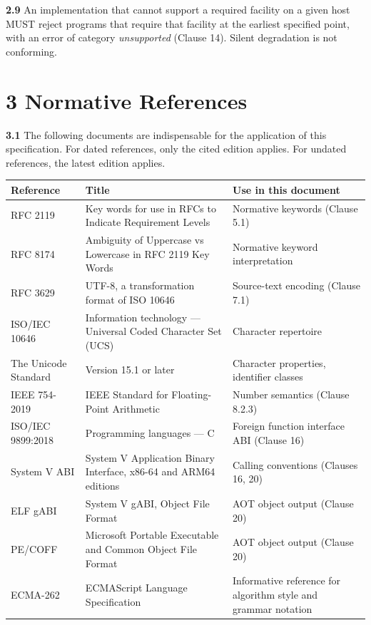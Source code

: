 \documentclass[
  english,
  11pt,
  a4paper,
]{article}
\begin{document}
\textbf{2.9} An implementation that cannot support a required facility
on a given host MUST reject programs that require that facility at the
earliest specified point, with an error of category \emph{unsupported}
(Clause 14). Silent degradation is not conforming.

\section{3 Normative References}\label{normative-references}

\textbf{3.1} The following documents are indispensable for the
application of this specification. For dated references, only the cited
edition applies. For undated references, the latest edition applies.

\begin{longtable}[]{@{}
  >{\raggedright\arraybackslash}p{}
  >{\raggedright\arraybackslash}p{}
  >{\raggedright\arraybackslash}p{}@{}}
\toprule\noalign{}
\begin{minipage}[b]{\linewidth}\raggedright
Reference
\end{minipage} & \begin{minipage}[b]{\linewidth}\raggedright
Title
\end{minipage} & \begin{minipage}[b]{\linewidth}\raggedright
Use in this document
\end{minipage} \\
\midrule\noalign{}
\endhead
\bottomrule\noalign{}
\endlastfoot
RFC 2119 & Key words for use in RFCs to Indicate Requirement Levels &
Normative keywords (Clause 5.1) \\
RFC 8174 & Ambiguity of Uppercase vs Lowercase in RFC 2119 Key Words &
Normative keyword interpretation \\
RFC 3629 & UTF-8, a transformation format of ISO 10646 & Source-text
encoding (Clause 7.1) \\
ISO/IEC 10646 & Information technology --- Universal Coded Character Set
(UCS) & Character repertoire \\
The Unicode Standard & Version 15.1 or later & Character properties,
identifier classes \\
IEEE 754-2019 & IEEE Standard for Floating-Point Arithmetic & Number
semantics (Clause 8.2.3) \\
ISO/IEC 9899:2018 & Programming languages --- C & Foreign function
interface ABI (Clause 16) \\
System V ABI & System V Application Binary Interface, x86-64 and ARM64
editions & Calling conventions (Clauses 16, 20) \\
ELF gABI & System V gABI, Object File Format & AOT object output (Clause
20) \\
PE/COFF & Microsoft Portable Executable and Common Object File Format &
AOT object output (Clause 20) \\
ECMA-262 & ECMAScript Language Specification & Informative reference for
algorithm style and grammar notation \\
\end{longtable}
\end{document}
